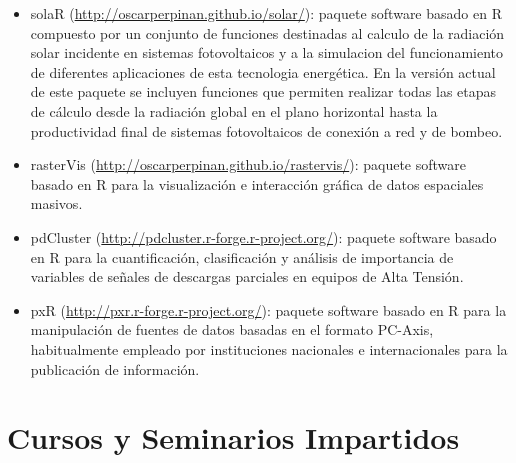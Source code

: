 \documentclass[article, a4paper]{memoir}
\begin{document}
\begin{itemize}
\item solaR (\url{http://oscarperpinan.github.io/solar/}): paquete software basado
en R compuesto por un conjunto de funciones destinadas al calculo de
la radiación solar incidente en sistemas fotovoltaicos y a la
simulacion del funcionamiento de diferentes aplicaciones de esta
tecnologia energética. En la versión actual de este paquete se
incluyen funciones que permiten realizar todas las etapas de cálculo
desde la radiación global en el plano horizontal hasta la
productividad final de sistemas fotovoltaicos de conexión a red y de
bombeo.

\item rasterVis (\url{http://oscarperpinan.github.io/rastervis/}): paquete software
basado en R para la visualización e interacción gráfica de datos
espaciales masivos.

\item pdCluster (\url{http://pdcluster.r-forge.r-project.org/}): paquete
software basado en R para la cuantificación, clasificación y
análisis de importancia de variables de señales de descargas
parciales en equipos de Alta Tensión.

\item pxR (\url{http://pxr.r-forge.r-project.org/}): paquete software basado en
R para la manipulación de fuentes de datos basadas en el formato
PC-Axis, habitualmente empleado por instituciones nacionales e
internacionales para la publicación de información.
\end{itemize}


\section{Cursos y Seminarios Impartidos}
\label{sec-8}
\end{document}
